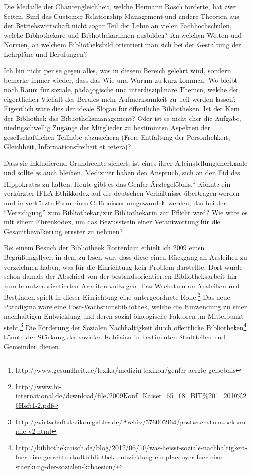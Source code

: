 \documentclass[a4paper,
fontsize=11pt,
oneside,
numbers=noperiodatend,
parskip=half-,
bibliography=totoc,
final
]{scrartcl}
\begin{document}
Die Medaille der Chancengleichheit, welche Hermann Rösch forderte, hat
zwei Seiten. Sind das Customer Relationship Management und andere
Theorien aus der Betriebswirtschaft nicht sogar Teil der Lehre an vielen
Fachhochschulen, welche Bibliothekare und Bibliothekarinnen ausbilden?
An welchen Werten und Normen, an welchem Bibliotheksbild orientiert man
sich bei der Gestaltung der Lehrpläne und Berufungen?

Ich bin nicht per se gegen alles, was in diesem Bereich gelehrt wird,
sondern bemerke immer wieder, dass das Wie und Warum zu kurz kommen. Wo
bleibt noch Raum für soziale, pädagogische und interdisziplinäre Themen,
welche der eigentlichen Vielfalt des Berufes mehr Aufmerksamkeit zu Teil
werden lassen? Eigentlich wäre dies der ideale Slogan für öffentliche
Bibliotheken. Ist der Kern der Bibliothek das Bibliotheksmanagement?
Oder ist es nicht eher die Aufgabe, niedrigschwellig Zugänge der
Mitglieder zu bestimmten Aspekten der gesellschaftlichen Teilhabe
abzusichern (Freie Entfaltung der Persönlichkeit, Gleichheit,
Informationsfreiheit et cetera)?

Dass sie inkludierend Grundrechte sichert, ist eines ihrer
Alleinstellungsmerkmale und sollte es auch bleiben. Mediziner haben den
Anspruch, sich an den Eid des Hippokrates zu halten. Heute gibt es das
Genfer Ärztegelöbnis.\footnote{\url{http://www.gesundheit.de/lexika/medizin-lexikon/genfer-aerzte-geloebnis}}
Könnte ein verkürzter IFLA-Ethikkodex auf die deutschen Verhältnisse
übertragen werden und in verkürzte Form eines Gelöbnisses umgewandelt
werden, das bei der \enquote{Vereidigung} zum Bibliothekar/zur
Bibliothekarin zur Pflicht wird? Wie wäre es mit einem Ehrenkodex, um
das Bewusstsein einer Verantwortung für die Gesamtbevölkerung ernster zu
nehmen?

Bei einem Besuch der Bibliotheek Rotterdam erhielt ich 2009 einen
Begrüßungsflyer, in dem zu lesen war, dass diese einen Rückgang an
Ausleihen zu verzeichnen haben, was für die Einrichtung kein Problem
darstellte. Dort wurde schon damals der Abschied von der
bestandsorientierten Bibliotheksarbeit hin zum benutzerorientierten
Arbeiten vollzogen. Das Wachstum an Ausleihen und Beständen spielt in
dieser Einrichtung eine untergeordnete Rolle.\footnote{\url{http://www.bi-international.de/download/file/2009Konf\_Kaiser\_65\_68\_BIT\%201\_2010\%20Heft1-2.pdf}}
Das neue Paradigma wäre eine Post-Wachstumsbibliothek, welche die
Hinwendung zu einer nachhaltigen Entwicklung und deren
sozial-ökologische Faktoren im Mittelpunkt steht.\footnote{\url{http://wirtschaftslexikon.gabler.de/Archiv/576005964/postwachstumsoekonomie-v2.html}}
Die Förderung der Sozialen Nachhaltigkeit durch öffentliche
Bibliotheken\footnote{\url{http://bibliothekarisch.de/blog/2012/06/10/was-heisst-soziale-nachhaltigkeit-fuer-eine-gerechte-stadtbibliotheksentwicklung-ein-plaedoyer-fuer-eine-staerkung-der-sozialen-kohaesion/}}
könnte der Stärkung der sozialen Kohäsion in bestimmten Stadtteilen und
Gemeinden dienen.
\end{document}
